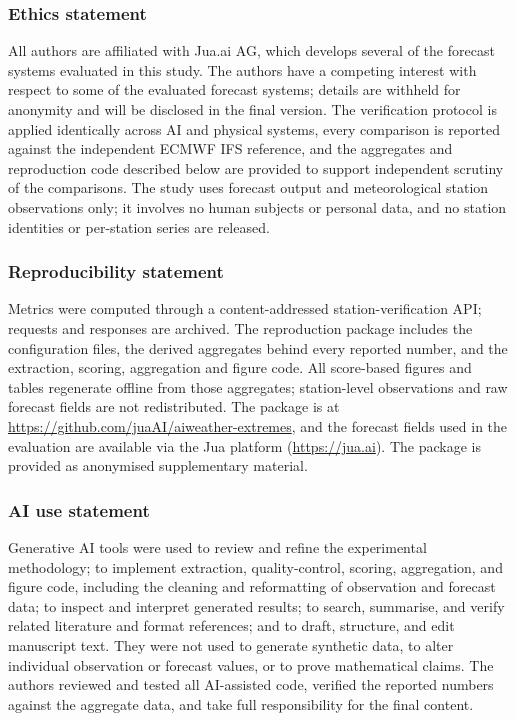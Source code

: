 \documentclass{article}
\begin{document}
\subsubsection*{Ethics statement}
\ificlrfinal
All authors are affiliated with Jua.ai AG, which develops several of the
forecast systems evaluated in this study.
\else
The authors have a competing interest with respect to some of the evaluated
forecast systems; details are withheld for anonymity and will be disclosed in
the final version.
\fi
The verification protocol is applied identically across AI and physical
systems, every comparison is reported against the independent ECMWF IFS
reference, and the aggregates and reproduction code described below are
provided to support independent scrutiny of the comparisons. The study uses forecast output and meteorological station
observations only; it involves no human subjects or personal data, and no
station identities or per-station series are released.

\subsubsection*{Reproducibility statement}
Metrics were computed through a content-addressed station-verification API;
requests and responses are archived. The reproduction package includes the
configuration files, the derived aggregates behind every reported number, and
the extraction, scoring, aggregation and figure code. All score-based figures
and tables regenerate offline from those aggregates; station-level
observations and raw forecast fields are not redistributed.
\ificlrfinal
The package is at \url{https://github.com/juaAI/aiweather-extremes}, and
the forecast fields used in the evaluation are available via the Jua
platform (\url{https://jua.ai}).
\else
The package is provided as anonymised supplementary material.
\fi

\subsubsection*{AI use statement}

Generative AI tools were used to review and refine the experimental
methodology; to implement extraction, quality-control, scoring, aggregation,
and figure code, including the cleaning and reformatting of observation and
forecast data; to inspect and interpret generated results; to
search, summarise, and verify related literature and format references; and
to draft, structure, and edit manuscript text. They were not used to generate
synthetic data, to alter individual observation or forecast values, or to
prove mathematical claims. The authors reviewed and tested all AI-assisted code, verified the
reported numbers against the aggregate data, and take full responsibility
for the final content.
\end{document}
